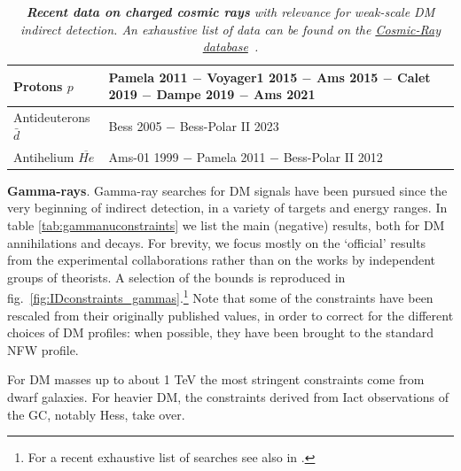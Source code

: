 \begin{table}
{\begin{center}
\begin{tabular}{|p{}|p{}|}
\hline
Protons \newline $p$ 			& {\sc Pamela} 2011 \cite{Adriani:2011cu} $-$ {\sc Voyager1} 2015 \cite{Voyagerepem} $-$ {\sc Ams} 2015 \cite{Aguilar:2015ooa} $-$ {\sc Calet} 2019 \cite{Adriani:2019aft} $-$ {\sc Dampe} 2019 \cite{An:2019wcw} $-$ {\sc Ams} 2021 \cite{Aguilar:2021tos} \\
\hline
Antideuterons \newline $\bar d$   		&  {\sc Bess} 2005 \cite{Fuke:2005it} $-$ {\sc Bess-Polar II} 2023 \cite{Sakai:2023uka} \\ 
\hline
Antihelium \newline $\overbar{He}$   		&  {\sc Ams-01} 1999 \cite{AMS:1999tha} $-$ {\sc Pamela} 2011 \cite{Mayorov:2011zz} $-$ {\sc Bess-Polar II} 2012 \cite{Abe:2012tz} \\ 
\hline
\end{tabular}
\end{center}}
\caption[Recent charged CR data]{\em  {\bfseries Recent data on charged cosmic rays} with relevance for weak-scale DM indirect detection. An exhaustive list of data can be found on the \href{https://lpsc.in2p3.fr/crdb}{Cosmic-Ray database}~\cite{CRDB}. 
\label{tab:CRdatareferences}}
\end{table}

\medskip

{\bf Gamma-rays}. Gamma-ray searches for DM signals have been pursued since the very beginning of indirect detection, in a variety of targets and energy ranges. 
In table \ref{tab:gammanuconstraints} we list the main (negative) results, both for DM annihilations and decays. For brevity, we focus mostly on the `official' results from the experimental collaborations rather than on the works by independent groups of theorists. 
A selection of the bounds is reproduced in fig.~\ref{fig:IDconstraints_gammas}.\footnote{For a recent exhaustive list of searches see also 
 in \cite{otherpastDMreviews}.} Note that some of the constraints have been rescaled  from their originally published values, in order to correct for the different choices of DM profiles: when possible, they have been brought to the standard NFW profile.

For DM masses up to about 1 TeV the most stringent constraints come from dwarf galaxies.  For heavier DM, the constraints derived from {\sc Iact} observations of the GC, notably {\sc Hess}, take over. 


\smallskip

